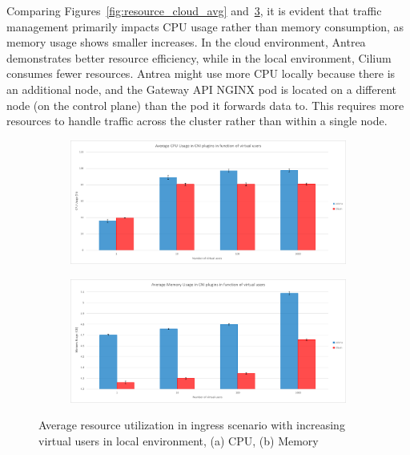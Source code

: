 Comparing Figures~\ref{fig:resource_cloud_avg} and~\ref{fig:resource_local_avg}, it is evident that traffic management primarily impacts CPU usage rather than memory consumption, as memory usage shows smaller increases. In the cloud environment, Antrea demonstrates better resource efficiency, while in the local environment, Cilium consumes fewer resources. Antrea might use more CPU locally because there is an additional node, and the Gateway API NGINX pod is located on a different node (on the control plane) than the pod it forwards data to. This requires more resources to handle traffic across the cluster rather than within a single node.

\begin{figure}[H]
    \centering
    \begin{subfigure}[b]{0.8\textwidth}
        \includegraphics[width=\textwidth]{plots/traffic-splitting/cpu_local.png}
        \caption{}
        \label{fig:cpu_local_avg}
    \end{subfigure}
    \begin{subfigure}[b]{0.8\textwidth}
        \includegraphics[width=\textwidth]{plots/traffic-splitting/memory_local.png}
        \caption{}
        \label{fig:memory_local_avg}
    \end{subfigure}
    
    \caption{Average resource utilization in ingress scenario with increasing virtual users in local environment, (a) CPU, (b) Memory}
    \label{fig:resource_local_avg}
\end{figure}


